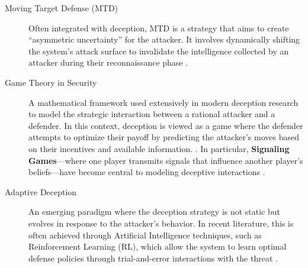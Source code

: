 \begin{description}
      \item[Moving Target Defense (MTD)]
            Often integrated with deception, MTD is a strategy that aims to create
            ``asymmetric uncertainty'' for the attacker. It involves dynamically shifting
            the system's attack surface to invalidate the intelligence collected by an
            attacker during their reconnaissance phase \cite{jajodia2011moving}.


      \item[Game Theory in Security]
            A mathematical framework used extensively in modern deception research to
            model the strategic interaction between a rational attacker and a defender.
            In this context, deception is viewed as a game where the defender attempts
            to optimize their payoff by predicting the attacker's moves based on their
            incentives and available information.
            \cite{carroll2011game,zhu2015game,pawlick2019game}. In particular,
            \textbf{Signaling Games}---where one player transmits signals that influence
            another player's beliefs---have become central to modeling deceptive
            interactions \cite{pawlick2019game}.



      \item[Adaptive Deception]
            An emerging paradigm where the deception strategy is not static but evolves
            in response to the attacker's behavior. In recent literature, this is often
            achieved through Artificial Intelligence techniques, such as Reinforcement
            Learning (RL), which allow the system to learn optimal defense policies through
            trial-and-error interactions with the threat \cite{hammad2024deep}.

\end{description}
